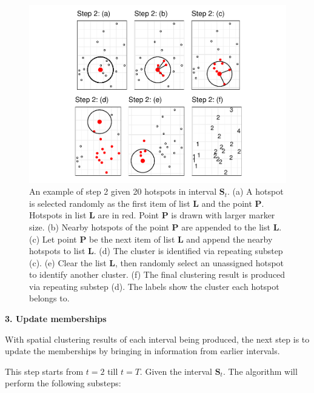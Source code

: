\begin{Schunk}
\begin{figure}

{\centering \includegraphics[width=0.8\linewidth]{clustering_paper_files/figure-latex/step2figs-1} 

}

\caption{An example of step 2 given 20 hotspots in interval $\boldsymbol{S}_t$. (a) A hotspot is selected randomly as the first item of list $\boldsymbol{L}$ and the point $\boldsymbol{P}$. Hotspots in list $\boldsymbol{L}$ are in red. Point $\boldsymbol{P}$ is drawn with larger marker size. (b) Nearby hotspots of the point $\boldsymbol{P}$ are appended to the list $\boldsymbol{L}$. (c) Let point $\boldsymbol{P}$ be the next item of list $\boldsymbol{L}$ and append the nearby hotspots to list $\boldsymbol{L}$. (d) The cluster is identified via repeating substep (c). (e) Clear the list $\boldsymbol{L}$, then randomly select an unassigned hotspot to identify another cluster. (f) The final clustering result is produced via repeating substep (d). The labels show the cluster each hotspot belongs to.}\label{fig:step2figs}
\end{figure}
\end{Schunk}

\textbf{3. Update memberships}

With spatial clustering results of each interval being produced, the
next step is to update the memberships by bringing in information from
earlier intervals.

This step starts from \(t=2\) till \(t=T\). Given the interval
\(\boldsymbol{S}_t\). The algorithm will perform the following substeps:

